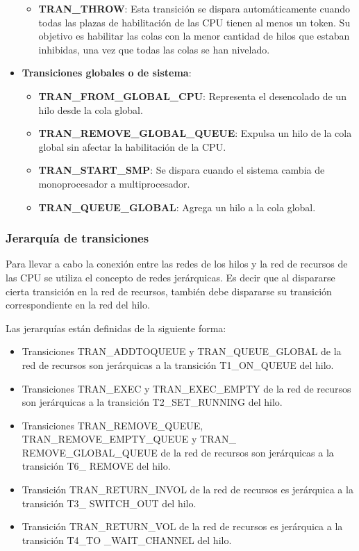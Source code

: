 \begin{itemize}
\begin{itemize}
            \item \textbf{TRAN\_THROW}: Esta transición se dispara automáticamente cuando todas las plazas de habilitación de las CPU tienen al menos un token. Su objetivo es habilitar las colas con la menor cantidad de hilos que estaban inhibidas, una vez que todas las colas se han nivelado.
        \end{itemize}
    \item \textbf{Transiciones globales o de sistema}:
        \begin{itemize}
            \item \textbf{TRAN\_FROM\_GLOBAL\_CPU}: Representa el desencolado de un hilo desde la cola global.
            \item \textbf{TRAN\_REMOVE\_GLOBAL\_QUEUE}: Expulsa un hilo de la cola global sin afectar la habilitación de la CPU.
            \item \textbf{TRAN\_START\_SMP}: Se dispara cuando el sistema cambia de monoprocesador a multiprocesador.
            \item \textbf{TRAN\_QUEUE\_GLOBAL}: Agrega un hilo a la cola global.
        \end{itemize}
    \end{itemize}


\subsubsection{Jerarquía de transiciones}
Para llevar a cabo la conexión entre las redes de los hilos y la red de recursos de las CPU se utiliza el concepto de redes jerárquicas. Es decir que al dispararse cierta transición en la red de recursos, también debe dispararse su transición correspondiente en la red del hilo.

Las jerarquías están definidas de la siguiente forma:

\begin{itemize}
    \item Transiciones TRAN\_ADDTOQUEUE y TRAN\_QUEUE\_GLOBAL de la red de recursos son jerárquicas a la transición T1\_ON\_QUEUE del hilo.
    \item Transiciones TRAN\_EXEC y TRAN\_EXEC\_EMPTY de la red de recursos son jerárquicas a la transición T2\_SET\_RUNNING del hilo.
    \item Transiciones TRAN\_REMOVE\_QUEUE, TRAN\_REMOVE\_EMPTY\_QUEUE y TRAN\_ REMOVE\_GLOBAL\_QUEUE de la red de recursos son jerárquicas a la transición T6\_ REMOVE del hilo.
    \item Transición TRAN\_RETURN\_INVOL de la red de recursos es jerárquica a la transición T3\_ SWITCH\_OUT del hilo.
    \item Transición TRAN\_RETURN\_VOL de la red de recursos es jerárquica a la transición T4\_TO \_WAIT\_CHANNEL del hilo.
\end{itemize}

